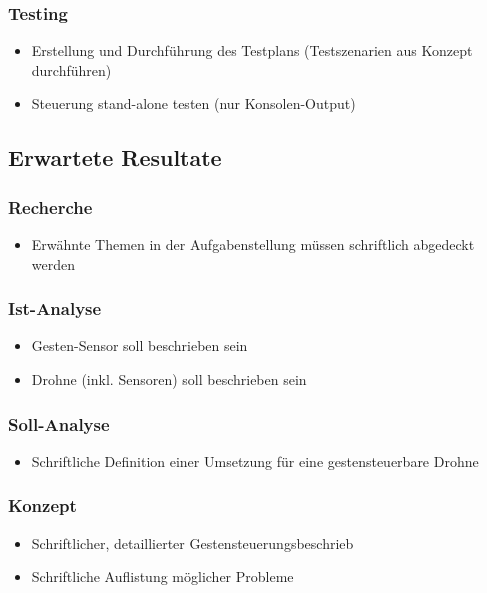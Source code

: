 \subsubsection{Testing}
\begin{itemize}
	\item Erstellung und Durchführung des Testplans (Testszenarien aus Konzept durchführen)
	\item Steuerung stand-alone testen (nur Konsolen-Output)
\end{itemize}

\subsection{Erwartete Resultate}
\subsubsection{Recherche}
\begin{itemize}
	\item Erwähnte Themen in der Aufgabenstellung müssen schriftlich abgedeckt werden
\end{itemize}

\subsubsection{Ist-Analyse}
\begin{itemize}
	\item Gesten-Sensor soll beschrieben sein
	\item Drohne (inkl. Sensoren) soll beschrieben sein
\end{itemize}

\subsubsection{Soll-Analyse}
\begin{itemize}
	\item Schriftliche Definition einer Umsetzung für eine gestensteuerbare Drohne
\end{itemize}

\subsubsection{Konzept}
\begin{itemize}
	\item Schriftlicher, detaillierter Gestensteuerungsbeschrieb
	\item Schriftliche Auflistung möglicher Probleme
\end{itemize}

